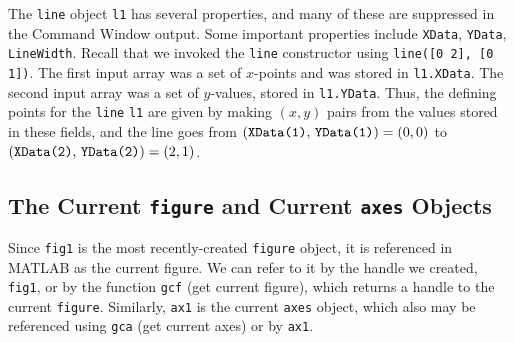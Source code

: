 The \texttt{line} object \texttt{l1} has several properties, and many of these are suppressed in the Command Window output. Some important properties include \texttt{XData}, \texttt{YData}, \texttt{LineWidth}. Recall that we invoked the \texttt{line} constructor using \verb!line([0 2], [0 1])!. The first input array was a set of $x$-points and was stored in \texttt{l1.XData}. The second input array was a set of $y$-values, stored in \texttt{l1.YData}. Thus, the defining points for the \texttt{line} \texttt{l1} are given by making $(x,y)$ pairs from the values stored in these fields, and the line goes from $\mbox{(\texttt{XData(1)}, \texttt{YData(1)})}=(0,0)$ to $\mbox{(\texttt{XData(2)}, \texttt{YData(2)})}=(2,1)$.

\subsection{The Current \texttt{figure} and Current \texttt{axes} Objects}
Since \texttt{fig1} is the most recently-created \texttt{figure} object, it is referenced in MATLAB as the current figure. We can refer to it by the handle we created, \texttt{fig1}, or by the function \texttt{gcf} (get current figure), which returns a handle to the current \texttt{figure}. Similarly, \texttt{ax1} is the current \texttt{axes} object, which also may be referenced using \texttt{gca} (get current axes) or by \texttt{ax1}.

